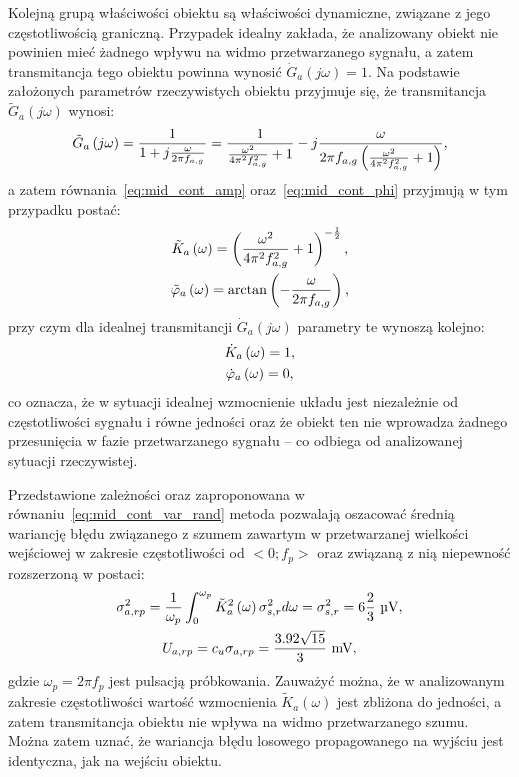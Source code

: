 Kolejną grupą właściwości obiektu są właściwości dynamiczne, związane z jego częstotliwością graniczną. Przypadek idealny zakłada, że analizowany obiekt nie powinien mieć żadnego wpływu na widmo przetwarzanego sygnału, a zatem transmitancja tego obiektu powinna wynosić $\dot{G}_{a}(j\omega) = 1$. Na podstawie założonych parametrów rzeczywistych obiektu przyjmuje się, że transmitancja $\tilde{G}_{a}(j\omega)$ wynosi:
\begin{equation}
\tilde{G}_{a} \left(j\omega\right) = \frac{1}{1 + j \frac{\omega}{2 \pi f_{a,g}}} = \frac{1}{\frac{\omega^{2}}{4 \pi^{2} f_{a,g}^{2}} + 1} - j \frac{\omega}{2 \pi f_{a,g} \left( \frac{\omega^{2}}{4 \pi^{2} f_{a,g}^{2}} + 1 \right) } \label{eq:sym_parta_trans},
\end{equation}
a zatem równania~\eqref{eq:mid_cont_amp} oraz~\eqref{eq:mid_cont_phi} przyjmują w tym przypadku postać:
\begin{gather}
\tilde{K}_{a} \left(\omega\right) = \left( \frac{\omega^{2}}{4 \pi^{2} f_{a,g}^{2}} + 1 \right)^{-\frac{1}{2}} \label{eq:sym_parta_amp_real}, \\
\tilde{\varphi}_{a} \left(\omega\right) = \arctan \left( -\frac{\omega}{2 \pi f_{a,g}} \right) \label{eq:sym_parta_phi_real},
\end{gather}
przy czym dla idealnej transmitancji $\dot{G}_{a}(j\omega)$ parametry te wynoszą kolejno:
\begin{gather}
\dot{K}_{a} \left(\omega\right) = 1 \label{eq:sym_parta_amp_ideal}, \\
\dot{\varphi}_{a} \left(\omega\right) = 0 \label{eq:sym_parta_phi_ideal},
\end{gather}
co oznacza, że w sytuacji idealnej wzmocnienie układu jest niezależnie od częstotliwości sygnału i równe jedności oraz że obiekt ten nie wprowadza żadnego przesunięcia w fazie przetwarzanego sygnału -- co odbiega od analizowanej sytuacji rzeczywistej.

Przedstawione zależności oraz zaproponowana w równaniu~\eqref{eq:mid_cont_var_rand} metoda pozwalają oszacować średnią wariancję błędu związanego z szumem zawartym w przetwarzanej wielkości wejściowej w zakresie częstotliwości od $<0;f_{p}>$ oraz związaną z nią niepewność rozszerzoną w postaci:
\begin{gather}
\sigma_{a,rp}^{2} = \frac{1}{\omega_{p}} \int _{0} ^{\omega_{p}} \tilde{K}_{a}^{2} \emb{\omega} \sigma_{s,r}^{2} d\omega = \sigma_{s,r}^{2} = 6 \frac{2}{3}~\unit{\micro V} \label{eq:sym_parta_rand_prop_var}, \\
U_{a,rp} = c_{u} \sigma_{a,rp} = \frac{3.92 \sqrt{15}}{3}~\unit{mV} \label{eq:sym_parta_rand_prop_unc},
\end{gather}
gdzie $\omega_{p} = 2 \pi f_{p}$ jest pulsacją próbkowania. Zauważyć można, że w analizowanym zakresie częstotliwości wartość wzmocnienia $\tilde{K}_{a}(\omega)$ jest zbliżona do jedności, a zatem transmitancja obiektu nie wpływa na widmo przetwarzanego szumu. Można zatem uznać, że wariancja błędu losowego propagowanego na wyjściu jest identyczna, jak na wejściu obiektu.

